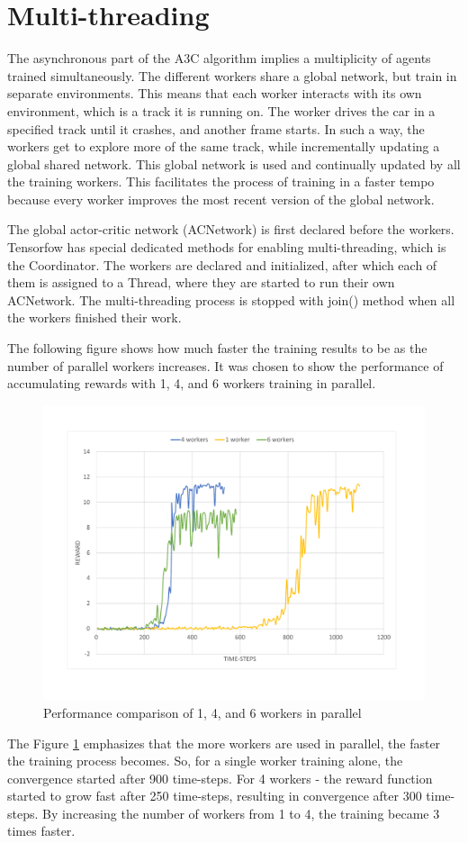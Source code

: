\section{Multi-threading}\label{Multi-threading}
The asynchronous part of the A3C algorithm implies a multiplicity of agents trained simultaneously. The different workers share a global network, but train in separate environments. This means that each worker interacts with its own environment, which is a track it is running on. The worker drives the car in a specified track until it crashes, and another frame starts. In such a way, the workers get to explore more of the same track, while incrementally updating a global shared network. This global network is used and continually updated by all the training workers. This facilitates the process of training in a faster tempo because every worker improves the most recent version of the global network.

The global actor-critic network (ACNetwork) is first declared before the workers. Tensorfow has special dedicated methods for enabling multi-threading, which is the Coordinator. The workers are declared and initialized, after which each of them is assigned to a Thread, where they are started to run their own ACNetwork. The multi-threading process is stopped with join() method when all the workers finished their work.

The following figure shows how much faster the training results to be as the number of parallel workers increases. It was chosen to show the performance of accumulating rewards with 1, 4, and  6 workers training in parallel.
\begin{figure}[H]
	\centering
	\includegraphics[width=\textwidth]{Figures/Workers}
	\caption{Performance comparison of 1, 4, and 6 workers in parallel}
	\label{fig:Workers}
\end{figure}
 The Figure \ref{fig:Workers} emphasizes that the more workers are used in parallel, the faster the training process becomes. So, for a single worker training alone, the convergence started after 900 time-steps. For 4 workers - the reward function started to grow fast after 250 time-steps, resulting in convergence after 300 time-steps. By increasing the number of workers from 1 to 4, the training became 3 times faster.
 
